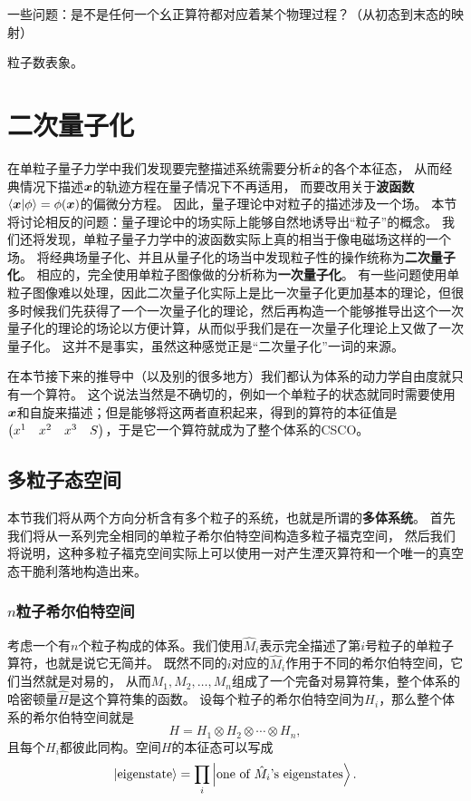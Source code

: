 \documentclass[UTF8, a4paper]{ctexart}
\begin{document}
一些问题：是不是任何一个幺正算符都对应着某个物理过程？（从初态到末态的映射）

粒子数表象。

\section{二次量子化}\label{sec:second-quantization}

在单粒子量子力学中我们发现要完整描述系统需要分析$\hat{\vb*{x}}$的各个本征态，
从而经典情况下描述$\vb*{x}$的轨迹方程在量子情况下不再适用，
而要改用关于\textbf{波函数}$\braket{\vb*{x}}{\phi} = \phi(\vb*{x})$的偏微分方程。
因此，量子理论中对粒子的描述涉及一个场。
本节将讨论相反的问题：量子理论中的场实际上能够自然地诱导出“粒子”的概念。
我们还将发现，单粒子量子力学中的波函数实际上真的相当于像电磁场这样的一个场。
将经典场量子化、并且从量子化的场当中发现粒子性的操作统称为\textbf{二次量子化}。
相应的，完全使用单粒子图像做的分析称为\textbf{一次量子化}。
有一些问题使用单粒子图像难以处理，因此二次量子化实际上是比一次量子化更加基本的理论，但很多时候我们先获得了一个一次量子化的理论，然后再构造一个能够推导出这个一次量子化的理论的场论以方便计算，从而似乎我们是在一次量子化理论上又做了一次量子化。
这并不是事实，虽然这种感觉正是“二次量子化”一词的来源。

在本节接下来的推导中（以及别的很多地方）我们都认为体系的动力学自由度就只有一个算符。
这个说法当然是不确切的，例如一个单粒子的状态就同时需要使用$\vb*{x}$和自旋来描述；但是能够将这两者直积起来，得到的算符的本征值是$\pmqty{ x^1 & x^2 & x^3 & S }$，于是它一个算符就成为了整个体系的CSCO。

\subsection{多粒子态空间}\label{sec:many-body-state}

本节我们将从两个方向分析含有多个粒子的系统，也就是所谓的\textbf{多体系统}。
首先我们将从一系列完全相同的单粒子希尔伯特空间构造多粒子福克空间，
然后我们将说明，这种多粒子福克空间实际上可以使用一对产生湮灭算符和一个唯一的真空态干脆利落地构造出来。

\subsubsection{$n$粒子希尔伯特空间}\label{sec:n-particle-space}

考虑一个有$n$个粒子构成的体系。我们使用$\hat{M}_i$表示完全描述了第$i$号粒子的单粒子算符，也就是说它无简并。
既然不同的$i$对应的$\hat{M}_i$作用于不同的希尔伯特空间，它们当然就是对易的，
从而$M_1, M_2, \ldots, M_n$组成了一个完备对易算符集，整个体系的哈密顿量$\hat{H}$是这个算符集的函数。
设每个粒子的希尔伯特空间为$H_i$，那么整个体系的希尔伯特空间就是
\[
    H = H_1 \otimes H_2 \otimes \cdots \otimes H_n,
\]
且每个$H_i$都彼此同构。空间$H$的本征态可以写成
\[
    \ket{\text{eigenstate}} = \prod_i \ket{\text{one of $\hat{M}_i$'s eigenstates}}.
\]
\end{document}
